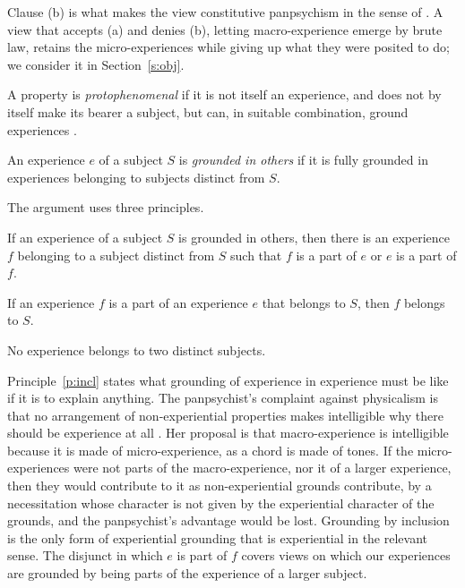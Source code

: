 \documentclass{situationist-preprint}
\begin{document}
Clause (b) is what makes the view constitutive panpsychism in the sense of \citet{Chalmers2017}. A view that accepts (a) and denies (b), letting macro-experience emerge by brute law, retains the micro-experiences while giving up what they were posited to do; we consider it in Section~\ref{s:obj}.

\begin{definition}[Protophenomenal]\label{d:proto}
A property is \emph{protophenomenal} if it is not itself an experience, and does not by itself make its bearer a subject, but can, in suitable combination, ground experiences \citep{Chalmers2013}.
\end{definition}

\begin{definition}\label{d:others}
An experience $e$ of a subject $S$ is \emph{grounded in others} if it is fully grounded in experiences belonging to subjects distinct from $S$.
\end{definition}

The argument uses three principles.

\begin{principle}[Inclusion]\label{p:incl}
If an experience of a subject $S$ is grounded in others, then there is an experience $f$ belonging to a subject distinct from $S$ such that $f$ is a part of $e$ or $e$ is a part of $f$.
\end{principle}

\begin{principle}[Ownership]\label{p:own}
If an experience $f$ is a part of an experience $e$ that belongs to $S$, then $f$ belongs to $S$.
\end{principle}

\begin{principle}[Exclusivity]\label{p:excl}
No experience belongs to two distinct subjects.
\end{principle}

Principle~\ref{p:incl} states what grounding of experience in experience must be like if it is to explain anything. The panpsychist's complaint against physicalism is that no arrangement of non-experiential properties makes intelligible why there should be experience at all \citep{Strawson2006}. Her proposal is that macro-experience is intelligible because it is made of micro-experience, as a chord is made of tones. If the micro-experiences were not parts of the macro-experience, nor it of a larger experience, then they would contribute to it as non-experiential grounds contribute, by a necessitation whose character is not given by the experiential character of the grounds, and the panpsychist's advantage would be lost. Grounding by inclusion is the only form of experiential grounding that is experiential in the relevant sense. The disjunct in which $e$ is part of $f$ covers views on which our experiences are grounded by being parts of the experience of a larger subject.
\end{document}
